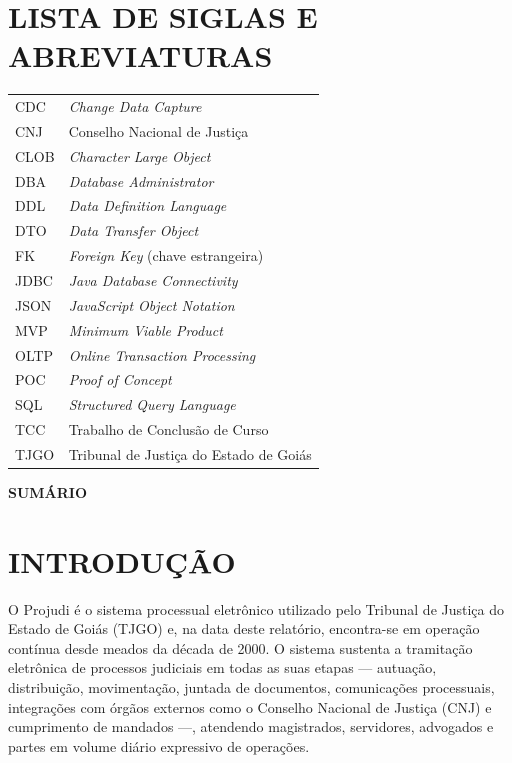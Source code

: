 \documentclass[12pt,letterpaper,oneside]{report}
\makeatletter
\renewcommand{\tableofcontents}{%
  \clearpage
  \thispagestyle{plain}%
  \begin{center}
    {\bfseries\fontsize{14}{16}\selectfont SUMÁRIO}
  \end{center}
  \vspace{1.2cm}
  \@starttoc{toc}%
}
\makeatother
\begin{document}
\clearpage

\chapter*{LISTA DE SIGLAS E ABREVIATURAS}

\begin{tabular}{@{}ll@{}}
CDC & \textit{Change Data Capture}\\
CNJ & Conselho Nacional de Justiça\\
CLOB & \textit{Character Large Object}\\
DBA & \textit{Database Administrator}\\
DDL & \textit{Data Definition Language}\\
DTO & \textit{Data Transfer Object}\\
FK & \textit{Foreign Key} (chave estrangeira)\\
JDBC & \textit{Java Database Connectivity}\\
JSON & \textit{JavaScript Object Notation}\\
MVP & \textit{Minimum Viable Product}\\
OLTP & \textit{Online Transaction Processing}\\
POC & \textit{Proof of Concept}\\
SQL & \textit{Structured Query Language}\\
TCC & Trabalho de Conclusão de Curso\\
TJGO & Tribunal de Justiça do Estado de Goiás\\
\end{tabular}

\clearpage

\tableofcontents
\clearpage


\chapter{INTRODUÇÃO}

O Projudi é o sistema processual eletrônico utilizado pelo Tribunal de Justiça do Estado de Goiás (TJGO) e, na data deste relatório, encontra-se em operação contínua desde meados da década de 2000. O sistema sustenta a tramitação eletrônica de processos judiciais em todas as suas etapas — autuação, distribuição, movimentação, juntada de documentos, comunicações processuais, integrações com órgãos externos como o Conselho Nacional de Justiça (CNJ) e cumprimento de mandados —, atendendo magistrados, servidores, advogados e partes em volume diário expressivo de operações.
\end{document}
